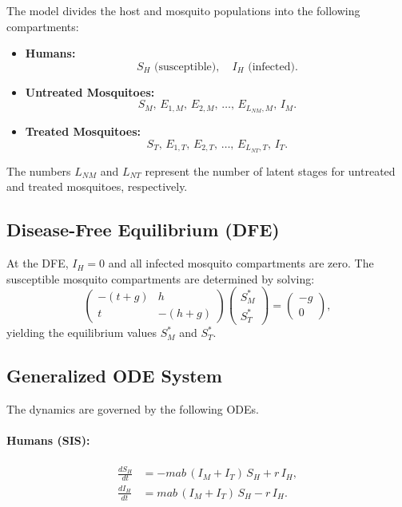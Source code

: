 \documentclass[12pt]{article}
\begin{document}
The model divides the host and mosquito populations into the following compartments:
\begin{itemize}
    \item \textbf{Humans:}
    \[
    S_H \text{ (susceptible)}, \quad I_H \text{ (infected)}.
    \]
    \item \textbf{Untreated Mosquitoes:}
    \[
    S_M,\, E_{1,M},\, E_{2,M},\, \dots,\, E_{L_{NM},M},\, I_M.
    \]
    \item \textbf{Treated Mosquitoes:}
    \[
    S_T,\, E_{1,T},\, E_{2,T},\, \dots,\, E_{L_{NT},T},\, I_T.
    \]
\end{itemize}
The numbers \(L_{NM}\) and \(L_{NT}\) represent the number of latent stages for untreated and treated mosquitoes, respectively.

\subsection{Disease-Free Equilibrium (DFE)}

At the DFE, \(I_H = 0\) and all infected mosquito compartments are zero. The susceptible mosquito compartments are determined by solving:
\[
\begin{pmatrix}
-(t+g) & h \\
t & -(h+g)
\end{pmatrix}
\begin{pmatrix}
S_M^* \\ S_T^*
\end{pmatrix}
=
\begin{pmatrix}
-g \\ 0
\end{pmatrix},
\]
yielding the equilibrium values \(S_M^*\) and \(S_T^*\).

\subsection{Generalized ODE System}

The dynamics are governed by the following ODEs.

\paragraph{Humans (SIS):}
\begin{align*}
\frac{dS_H}{dt} &= -mab\,(I_M + I_T)\,S_H + r\,I_H, \\
\frac{dI_H}{dt} &= mab\,(I_M + I_T)\,S_H - r\,I_H.
\end{align*}
\end{document}
